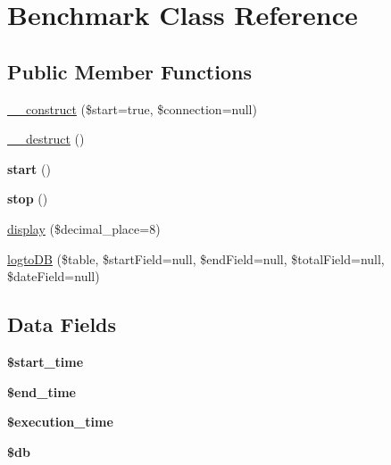 \hypertarget{class_benchmark}{\section{Benchmark Class Reference}
\label{class_benchmark}
}
\subsection*{Public Member Functions}
\begin{DoxyCompactItemize}
\item 
\hyperlink{class_benchmark_af7d99cdaac06dc7b47d681b4cfbb06bc}{\-\_\-\-\_\-construct} (\$start=true, \$connection=null)
\item 
\hyperlink{class_benchmark_a421831a265621325e1fdd19aace0c758}{\-\_\-\-\_\-destruct} ()
\item 
\hypertarget{class_benchmark_af8fa59992209e36dccb3eefb0f75531f}{{\bfseries start} ()}\label{class_benchmark_af8fa59992209e36dccb3eefb0f75531f}

\item 
\hypertarget{class_benchmark_a8b6fc76a620d7557d06e9a11a9ffb509}{{\bfseries stop} ()}\label{class_benchmark_a8b6fc76a620d7557d06e9a11a9ffb509}

\item 
\hyperlink{class_benchmark_aa836be07a8d7f803a8f6acc965acf2a3}{display} (\$decimal\-\_\-place=8)
\item 
\hyperlink{class_benchmark_ae0a10b5f75fa87d91e692d4f276ac7ae}{logto\-D\-B} (\$table, \$start\-Field=null, \$end\-Field=null, \$total\-Field=null, \$date\-Field=null)
\end{DoxyCompactItemize}
\subsection*{Data Fields}
\begin{DoxyCompactItemize}
\item 
\hypertarget{class_benchmark_a73a034a7a0fbdd2c93f23fb6c9946ee9}{{\bfseries \$start\-\_\-time}}\label{class_benchmark_a73a034a7a0fbdd2c93f23fb6c9946ee9}

\item 
\hypertarget{class_benchmark_a53df77622d4c20adefa70db294377d7b}{{\bfseries \$end\-\_\-time}}\label{class_benchmark_a53df77622d4c20adefa70db294377d7b}

\item 
\hypertarget{class_benchmark_a2d8dc53e1ba1a00dd213589f7a5f4377}{{\bfseries \$execution\-\_\-time}}\label{class_benchmark_a2d8dc53e1ba1a00dd213589f7a5f4377}

\item 
\hypertarget{class_benchmark_a1fa3127fc82f96b1436d871ef02be319}{{\bfseries \$db}}\label{class_benchmark_a1fa3127fc82f96b1436d871ef02be319}

\end{DoxyCompactItemize}


